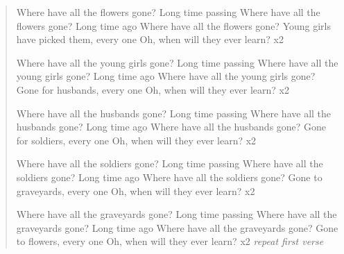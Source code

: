 \begin{verse}
\begin{centering}
\vspace{3pt}    

\note Where have all the flowers gone?
\newline Long time passing
\newline Where have all the flowers gone?
\newline Long time ago
\newline Where have all the flowers gone?
\newline Young girls have picked them, every one
\newline Oh, when will they ever learn? x2
\par Where have all the young girls gone?
\newline Long time passing
\newline Where have all the young girls gone?
\newline Long time ago
\newline Where have all the young girls gone?
\newline Gone for husbands, every one
\newline Oh, when will they ever learn? x2
\par Where have all the husbands gone?
\newline Long time passing
\newline Where have all the husbands gone?
\newline Long time ago
\newline Where have all the husbands gone?
\newline Gone for soldiers, every one
\newline Oh, when will they ever learn? x2
\par Where have all the soldiers gone?
\newline Long time passing
\newline Where have all the soldiers gone?
\newline Long time ago
\newline Where have all the soldiers gone?
\newline Gone to graveyards, every one
\newline Oh, when will they ever learn? x2
\par Where have all the graveyards gone?
\newline Long time passing
\newline Where have all the graveyards gone?
\newline Long time ago
\newline Where have all the graveyards gone?
\newline Gone to flowers, every one
\newline Oh, when will they ever learn? x2
\newline \textit{repeat first verse}


\end{centering}
\end{verse}

